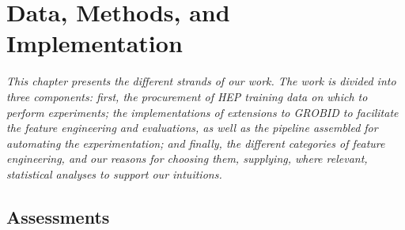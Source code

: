 
\chapter{Data, Methods, and Implementation} %

\label{Chapter4} %


\emph{This chapter presents the different strands of our work. The work is divided into three components: first, the procurement of HEP training data on which to perform experiments; the implementations of extensions to GROBID to facilitate the feature engineering and evaluations, as well as the pipeline assembled for automating the experimentation; and finally, the different categories of feature engineering, and our reasons for choosing them, supplying, where relevant, statistical analyses to support our intuitions.}

\section{Assessments}

